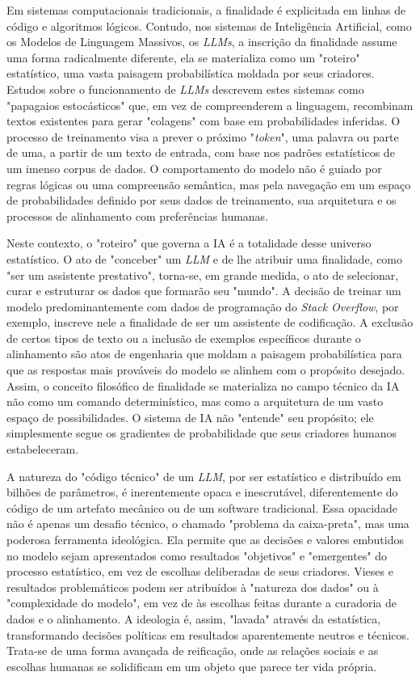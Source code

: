 Em sistemas computacionais tradicionais, a finalidade é explicitada em linhas de código e algoritmos lógicos. Contudo, nos sistemas de Inteligência Artificial, como os Modelos 
de Linguagem Massivos, os \textit{LLMs}, a inscrição da finalidade assume uma forma radicalmente diferente, ela se materializa como um "roteiro" estatístico, uma vasta paisagem 
probabilística moldada por seus criadores. Estudos sobre o funcionamento de \textit{LLMs} descrevem estes sistemas como "papagaios estocásticos" que, em vez de compreenderem a linguagem, 
recombinam textos existentes para gerar "colagens" com base em probabilidades inferidas. O processo de treinamento visa a prever o próximo "\textit{token}", uma palavra ou parte de uma, 
a partir de um texto de entrada, com base nos padrões estatísticos de um imenso corpus de dados. O comportamento do modelo não é guiado por regras lógicas ou uma compreensão 
semântica, mas pela navegação em um espaço de probabilidades definido por seus dados de treinamento, sua arquitetura e os processos de alinhamento com preferências humanas.   

Neste contexto, o "roteiro" que governa a IA é a totalidade desse universo estatístico. O ato de "conceber" um \textit{LLM} e de lhe atribuir uma finalidade, como "ser um assistente 
prestativo", torna-se, em grande medida, o ato de selecionar, curar e estruturar os dados que formarão seu "mundo". A decisão de treinar um modelo predominantemente com dados 
de programação do \textit{Stack Overflow}, por exemplo, inscreve nele a finalidade de ser um assistente de codificação. A exclusão de certos tipos de texto ou a inclusão de exemplos 
específicos durante o alinhamento são atos de engenharia que moldam a paisagem probabilística para que as respostas mais prováveis do modelo se alinhem com o propósito desejado. 
Assim, o conceito filosófico de finalidade se materializa no campo técnico da IA não como um comando determinístico, mas como a arquitetura de um vasto espaço de possibilidades. 
O sistema de IA não "entende" seu propósito; ele simplesmente segue os gradientes de probabilidade que seus criadores humanos estabeleceram.   

A natureza do "código técnico" de um \textit{LLM}, por ser estatístico e distribuído em bilhões de parâmetros, é inerentemente opaca e inescrutável, diferentemente do código de um 
artefato mecânico ou de um software tradicional. Essa opacidade não é apenas um desafio técnico, o chamado "problema da caixa-preta", mas uma poderosa ferramenta ideológica. 
Ela permite que as decisões e valores embutidos no modelo sejam apresentados como resultados "objetivos" e "emergentes" do processo estatístico, em vez de escolhas deliberadas 
de seus criadores. Vieses e resultados problemáticos podem ser atribuídos à "natureza dos dados" ou à "complexidade do modelo", em vez de às escolhas feitas durante a curadoria 
de dados e o alinhamento. A ideologia é, assim, "lavada" através da estatística, transformando decisões políticas em resultados aparentemente neutros e técnicos. Trata-se de 
uma forma avançada de reificação, onde as relações sociais e as escolhas humanas se solidificam em um objeto que parece ter vida própria.

